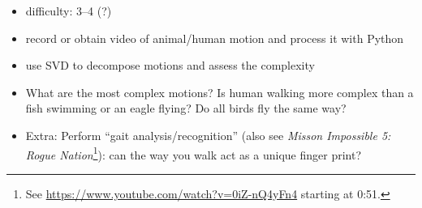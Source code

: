 \documentclass[letterpaper]{scrartcl}
\begin{document}
\begin{itemize}
\item difficulty: 3--4 (?)
\item record or obtain video of animal/human motion and process it
  with Python
\item use SVD to decompose motions and assess the complexity
\item What are the most complex motions? Is human walking more complex
  than a fish swimming or an eagle flying? Do all birds fly the same
  way?
\item Extra: Perform ``gait analysis/recognition'' (also see
  \emph{Misson Impossible 5: Rogue Nation}\footnote{See
    \url{https://www.youtube.com/watch?v=0iZ-nQ4yFn4} starting at
    0:51.}): can the way you walk act as a unique finger print?
\end{itemize}
\end{document}
